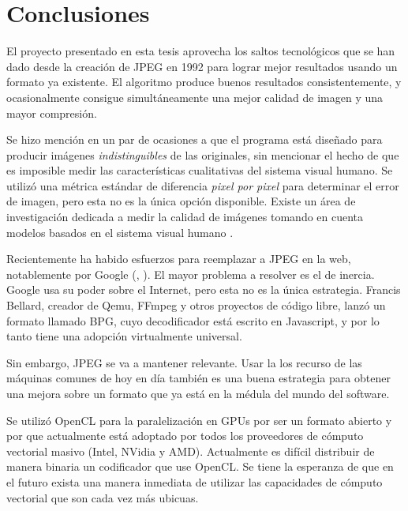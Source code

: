 
\chapter{Conclusiones}\label{ch:conclusiones}

El proyecto presentado en esta tesis aprovecha los saltos tecnológicos que se
han dado desde la creación de JPEG en 1992 \cite{jpeg-spec} para lograr mejor
resultados usando un formato ya existente. El algoritmo produce buenos
resultados consistentemente, y ocasionalmente consigue simultáneamente una
mejor calidad de imagen y una mayor compresión.

Se hizo mención en un par de ocasiones a que el programa está diseñado para
producir imágenes \emph{indistinguibles} de las originales, sin mencionar el
hecho de que es imposible medir las características cualitativas del sistema
visual humano. Se utilizó una métrica estándar de diferencia \emph{pixel por
pixel} para determinar el error de imagen, pero esta no es la única opción
disponible. Existe un área de investigación dedicada a medir la calidad de
imágenes tomando en cuenta modelos basados en el sistema visual humano
\cite{subjective-paper}.

Recientemente ha habido esfuerzos para reemplazar a JPEG en la web,
notablemente por Google (\cite{brotli}, \cite{webp}). El mayor problema a
resolver es el de inercia. Google usa su poder sobre el Internet, pero esta no
es la única estrategia. Francis Bellard, creador de Qemu, FFmpeg y otros
proyectos de código libre, lanzó un formato llamado \gls{BPG}, cuyo
decodificador está escrito en Javascript, y por lo tanto tiene una adopción
virtualmente universal.

Sin embargo, JPEG se va a mantener relevante. Usar la los recurso de las
máquinas comunes de hoy en día también es una buena estrategia para obtener una
mejora sobre un formato que ya está en la médula del mundo del software.

Se utilizó OpenCL para la paralelización en GPUs por ser un formato abierto y
por que actualmente está adoptado por todos los proveedores de cómputo
vectorial masivo (Intel, NVidia y AMD). Actualmente es difícil distribuir de
manera binaria un codificador que use OpenCL. Se tiene la esperanza de que en
el futuro exista una manera inmediata de utilizar las capacidades de cómputo
vectorial que son cada vez más ubicuas.

